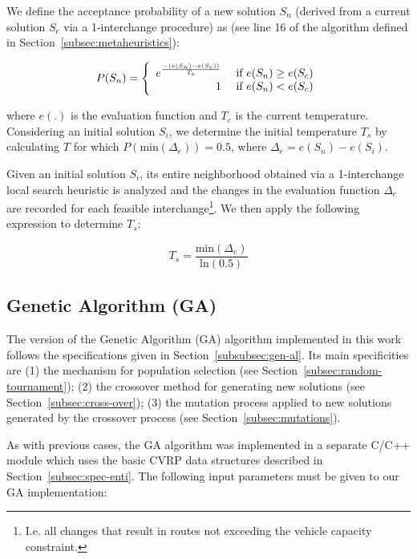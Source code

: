 We define the acceptance probability of a new solution $S_n$ (derived from a 
current solution 
$S_c$ via a 1-interchange procedure) as (see line 16 of the algorithm defined 
in Section~\ref{subsec:metaheuristics}):

\begin{equation*}
    P(S_n) = \left\{ 
        \begin{array}{rl}
            e^\frac{-(e(S_n) - e(S_c))}{T_c} &\mbox{ \text{if $e(S_n) \geq e(S_c)$}} \\
            1 &\mbox{ \text{if $e(S_n) < e(S_c)$}}
        \end{array} \right.
    \label{eq:sa-accept}
\end{equation*}

where $e(.)$ is the evaluation function and $T_c$ is the current temperature. 
Considering an initial solution $S_i$, we determine the initial temperature 
$T_s$ by calculating $T$ for which $P(\text{min}(\Delta_e)) = 0.5$, 
where $\Delta_e = e(S_n) - e(S_i)$.\vertbreak

Given an initial solution $S_i$, its entire neighborhood obtained via a 
1-interchange local search heuristic is analyzed and the changes in the 
evaluation function $\Delta_e$ 
are recorded for each feasible interchange\footnote{I.e. all changes that 
result in routes not exceeding the vehicle capacity constraint.}. We then 
apply the following expression to determine $T_s$:

\[T_s = \frac{\text{min}(\Delta_{e})}{\text{ln}(0.5)}\]

\subsection{Genetic Algorithm (GA)}
\label{subsec:ga}

The version of the Genetic Algorithm (GA) algorithm implemented in this work 
follows the specifications given in Section~\ref{subsubsec:gen-al}. Its main 
specificities are (1) the mechanism for 
population selection (see Section~\ref{subsec:random-tournament}); (2) the 
crossover method for generating new solutions (see 
Section~\ref{subsec:cross-over}); (3) the mutation process applied to 
new solutions generated by the crossover process (see 
Section~\ref{subsec:mutations}).\vertbreak

As with previous cases, the GA algorithm was implemented in a separate 
C\slash C++ module which uses the basic CVRP data structures described in 
Section~\ref{subsec:spec-enti}. The following input 
parameters must be given to our GA implementation:

